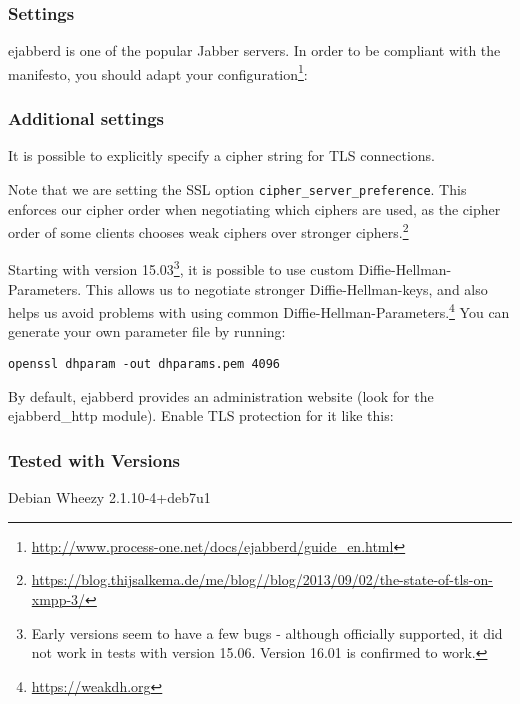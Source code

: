 \subsubsection{Settings}
ejabberd is one of the popular Jabber servers. In order to be compliant
with the manifesto, you should adapt your configuration\footnote{\url{http://www.process-one.net/docs/ejabberd/guide_en.html}}:

% 
\subsubsection{Additional settings}
It is possible to explicitly specify a cipher string for TLS connections.

Note that we are setting the SSL option \texttt{cipher\_server\_preference}. This enforces our cipher order when negotiating which ciphers are used, as the cipher order of some clients chooses weak ciphers over stronger ciphers.\footnote{\url{https://blog.thijsalkema.de/me/blog//blog/2013/09/02/the-state-of-tls-on-xmpp-3/}}

Starting with version 15.03\footnote{Early versions seem to have a few bugs - although officially supported, it did not work in tests with version 15.06. Version 16.01 is confirmed to work.}, it is possible to use custom Diffie-Hellman-Parameters. This allows us to negotiate stronger Diffie-Hellman-keys, and also helps us avoid problems with using common Diffie-Hellman-Parameters.\footnote{\url{https://weakdh.org}} You can generate your own parameter file by running:
\begin{lstlisting}
openssl dhparam -out dhparams.pem 4096
\end{lstlisting}

By default, ejabberd provides an administration website (look for the ejabberd\_http module). Enable TLS protection for it like this:


\subsubsection{Tested with Versions}
\begin{itemize*}
\item Debian Wheezy 2.1.10-4+deb7u1
\end{itemize*}

